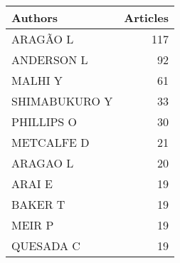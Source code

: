 
\begin{tabular}{lr}
\toprule
Authors & Articles\\
\midrule
ARAGÃO L & 117\\
ANDERSON L & 92\\
MALHI Y & 61\\
SHIMABUKURO Y & 33\\
PHILLIPS O & 30\\
\addlinespace
METCALFE D & 21\\
ARAGAO L & 20\\
ARAI E & 19\\
BAKER T & 19\\
MEIR P & 19\\
\addlinespace
QUESADA C & 19\\
\bottomrule
\end{tabular}
